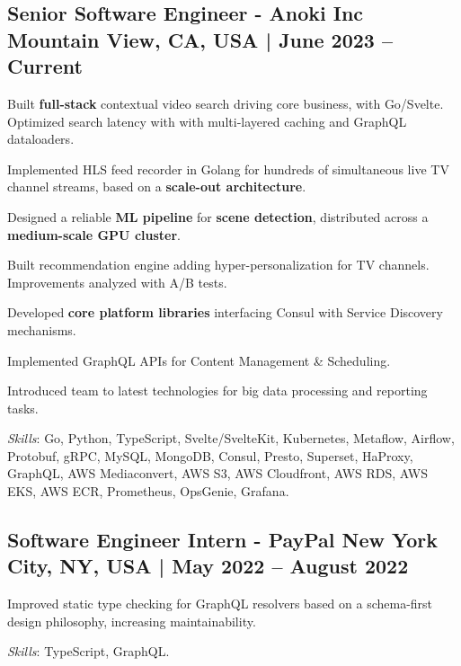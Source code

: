 \subsection{{Senior Software Engineer - Anoki Inc \hfill  Mountain View, CA, USA  | June 2023 -- Current}}
\begin{zitemize}
\item Built \textbf{full-stack} contextual video search driving core business, with Go/Svelte. Optimized search latency with with multi‑layered caching and GraphQL dataloaders. 
\item Implemented HLS feed recorder in Golang for hundreds of simultaneous live TV channel streams, based on a \textbf{scale-out architecture}.
\item Designed a reliable \textbf{ML pipeline} for \textbf{scene detection}, distributed across a \textbf{medium-scale GPU cluster}. 
\item Built recommendation engine adding hyper-personalization for TV channels. Improvements analyzed with A/B tests.
\item Developed \textbf{core platform libraries} interfacing Consul with Service Discovery mechanisms.
\item Implemented GraphQL APIs for Content Management \& Scheduling.
\item Introduced team to latest technologies for big data processing and reporting tasks.
\end{zitemize}
\textit{Skills}: Go, Python, TypeScript, Svelte/SvelteKit, Kubernetes, Metaflow, Airflow, Protobuf, gRPC, MySQL, MongoDB, Consul, Presto, Superset, HaProxy, GraphQL, AWS Mediaconvert, AWS S3, AWS Cloudfront, AWS RDS, AWS EKS, AWS ECR, Prometheus, OpsGenie, Grafana.
\vspace*{2mm}
\subsection{{Software Engineer Intern - PayPal \hfill New York City, NY, USA | May 2022 -- August 2022}}
\begin{zitemize}
\item Improved static type checking for GraphQL resolvers based on a schema-first design philosophy, increasing maintainability.
\end{zitemize}

\textit{Skills}: TypeScript, GraphQL.
\vspace*{1mm}


